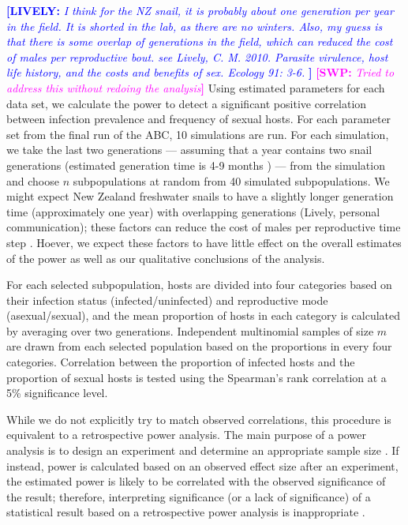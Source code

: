 \documentclass{article}\usepackage[]{graphicx}\usepackage[]{color}
\newcommand{\comment}[3]{\textcolor{#1}{\textbf{[#2: }\textit{#3}\textbf{]}}}
\newcommand{\swp}[1]{\comment{magenta}{SWP}{#1}}
\newcommand{\lively}[1]{\comment{blue}{LIVELY}{#1}}
\begin{document}
\lively{
I think for the NZ snail, it is probably about one generation per year in the field.  It is shorted in the lab, as there are no winters.  Also, my guess is that there is some overlap of generations in the field, which can reduced the cost of males per reproductive bout.  see Lively, C. M.  2010.  Parasite virulence, host life history, and the costs and benefits of sex.  Ecology 91: 3-6.
}
\swp{Tried to address this without redoing the analysis}
Using estimated parameters for each data set, we calculate the power to detect a significant positive correlation between infection prevalence and frequency of sexual hosts.
For each parameter set from the final run of the ABC, 10 simulations are run.
For each simulation, we take the last two generations --- assuming that a year contains two snail generations (estimated generation time is 4-9 months \citep{neiman2005variation}) --- from the simulation and choose $n$ subpopulations at random from 40 simulated subpopulations.
We might expect New Zealand freshwater snails to have a slightly longer generation 
time (approximately one year) with overlapping generations (Lively, personal communication);
these factors can reduce the cost of males per reproductive time step \citep{lively2010parasite}.
Hoever, we expect these factors to have little effect on the overall estimates of the power
as well as our qualitative conclusions of the analysis.

For each selected subpopulation, hosts are divided into four categories based on their infection status (infected/uninfected) and reproductive mode (asexual/sexual),
and the mean proportion of hosts in each category is calculated by averaging over two generations.
Independent multinomial samples of size $m$ are drawn from each selected population based on the proportions in every four categories. 
Correlation between the proportion of infected hosts and the proportion of sexual hosts is tested using the Spearman's rank correlation at a 5\% significance level.

While we do not explicitly try to match observed correlations, this procedure is equivalent to a retrospective power analysis.
The main purpose of a power analysis is to design an experiment and determine an appropriate sample size \citep{cohen1992statistical}.
If instead, power is calculated based on an observed effect size after an experiment, the estimated power is likely to be correlated with the observed significance of the result;
therefore, interpreting significance (or a lack of significance) of a statistical result based on a retrospective power analysis is inappropriate \citep{goodman1994use, senn2002power}.
\end{document}
